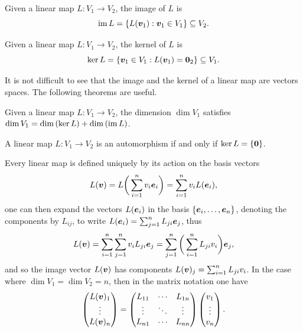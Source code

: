 \begin{defn}
\label{defn: kernel of a linear map}
    Given a linear map $L : V_1 \to V_2$, the image of $L$ is 
    \begin{equation}
        \mathrm{im}\,{L} = \{L(\bm{v}_1) : \bm{v}_1 \in V_1\} \subseteq V_2.
    \end{equation}
\end{defn}
\begin{defn}
\label{defn: image of a linear map}
    Given a linear map $L : V_1 \to V_2$, the kernel of $L$ is 
    \begin{equation}
        \ker{L} = \{\bm{v}_1 \in V_1 : L(\bm{v}_1) = \bm{0}_2\} \subseteq V_1.
    \end{equation}
\end{defn}
It is not difficult to see that the image and the kernel of a linear map are vectors spaces. The following theorems are useful.
\begin{teo}
    Given a linear map $L : V_1 \to V_2$, the dimension $\dim{V_1}$ satisfies $\dim{V_1} = \dim{(\ker{L})} + \dim{(\mathrm{im}\,{L})}$.
\end{teo}
\begin{teo}
    A linear map $L : V_1 \to V_2$ is an automorphism if and only if $\ker{L} = \{\bm{0}\}$.
\end{teo}
Every linear map is defined uniquely by its action on the basis vectors 
\begin{equation}
    L(\bm{v}) = L\bigg(\sum_{i=1}^nv_i\bm{e}_i\bigg) = \sum_{i=1}^nv_iL(\bm{e}_i),
\end{equation}
one can then expand the vectors $L(\bm{e}_i)$ in the basis $\{\bm{e}_i,\dots,\bm{e}_n\}$, denoting the components by $L_{ij}$, to write $L(\bm{e}_i) = \sum_{j=1}^nL_{ji}\bm{e}_j$, thus
\begin{equation}
    L(\bm{v}) = \sum_{i=1}^n\sum_{j=1}^nv_iL_{ji}\bm{e}_j = \sum_{j=1}^n\bigg(\sum_{i=1}^nL_{ji}v_i\bigg)\bm{e}_j,
\end{equation}
and so the image vector $L(\bm{v})$ has components $L(\bm{v})_j = \sum_{i=1}^nL_{ji}v_i$. In the case where $\dim{V_1} = \dim{V_2} = n$, then in the matrix notation one have
\begin{equation}
    \begin{pmatrix}
        L(\bm{v})_1 \\
        \vdots \\
        L(\bm{v})_n
    \end{pmatrix}
    =
    \begin{pmatrix}
        L_{11} & \cdots & L_{1n} \\
        \vdots & \ddots & \vdots \\
        L_{n1} & \cdots & L_{nn}
    \end{pmatrix}
    \begin{pmatrix}
        v_1 \\
        \vdots \\
        v_n
    \end{pmatrix}.
\end{equation}

